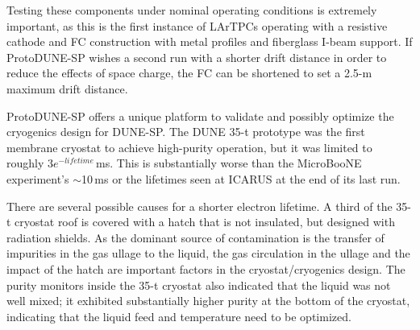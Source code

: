 Testing these components under nominal operating conditions is extremely important, as this is the first instance of LArTPCs operating with a resistive cathode %
and FC construction with metal profiles and fiberglass I-beam support. 
If ProtoDUNE-SP wishes a second run with a shorter drift distance in order to reduce the effects of space charge, the FC can be shortened to set a 2.5-m maximum drift distance.

ProtoDUNE-SP offers a unique platform to validate and possibly optimize the cryogenics design for DUNE-SP. The DUNE 35-t prototype was the first membrane cryostat to achieve high-purity operation, but it was limited to roughly $3e^{-lifetime}$\,ms. This is substantially worse than the MicroBooNE experiment's  $\sim$10\,ms or the lifetimes seen at ICARUS at the end of its last run. 

There are several possible causes for a shorter electron lifetime.  A third of the 35-t cryostat roof is covered with a hatch that is not insulated, but designed with radiation shields. As the dominant source of contamination is the transfer of impurities in the gas ullage to the liquid, the gas circulation in the ullage and the impact of the hatch are important factors in the cryostat/cryogenics design. The purity monitors inside the 35-t cryostat also indicated that the liquid was not well mixed; it exhibited substantially higher purity at the bottom of the cryostat, indicating that the liquid feed and temperature need to be optimized.  


